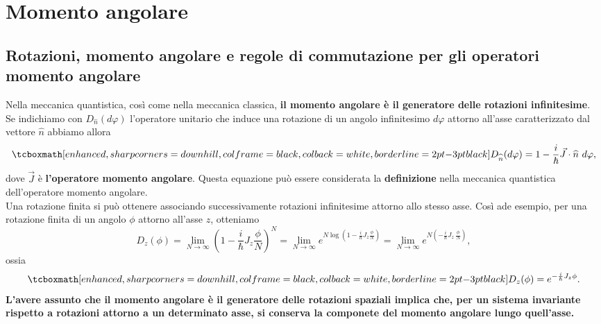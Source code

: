 \chapter{Momento angolare}
\section[Rotazioni, momento angolare e regole di commutazione]{Rotazioni, momento angolare e regole di commutazione per gli operatori momento angolare}
Nella meccanica quantistica, così come nella meccanica classica, \textbf{il momento angolare è il generatore delle rotazioni infinitesime}.\\

Se indichiamo con $D_{\widehat{n}} (d\varphi)$ l'operatore unitario che induce una rotazione di un angolo infinitesimo $d\varphi$ attorno all'asse caratterizzato dal vettore $\widehat{n}$ abbiamo allora
	\begin{equation}
		\tcboxmath[enhanced, sharp corners=downhill, colframe=black, colback=white, borderline={2pt}{-3pt}{black}]{
			D_{\widehat{n}} (d\varphi)=1-\frac{i}{\hbar}\vec{J}\cdot \widehat{n}\ d\varphi ,
			}
	\end{equation}
dove $\vec{J}$ è \textbf{l'operatore momento angolare}. Questa equazione può essere considerata la \textbf{definizione} nella meccanica quantistica dell'operatore momento angolare.\\

Una rotazione finita si può ottenere associando successivamente rotazioni infinitesime attorno allo stesso asse. Così ade esempio, per una rotazione finita di un angolo $\phi$ attorno all'asse $z$, otteniamo
	\begin{equation}
		D_z (\phi) = \lim _{N\rightarrow \infty} \left(1-\frac{i}{\hbar} J_z \frac{\phi}{N}\right) ^N= \lim _{N\rightarrow \infty} e^{N\log\left(1-\frac{i}{\hbar} J_z \frac{\phi}{N}\right)}= \lim _{N\rightarrow \infty} e^{N\left(-\frac{i}{\hbar} J_z \ \frac{\phi}{N}\right)},
	\end{equation}
ossia
	\begin{equation}
		\tcboxmath[enhanced, sharp corners=downhill, colframe=black, colback=white, borderline={2pt}{-3pt}{black}]{
			D_z (\phi)=e^{-\frac{i}{\hbar} J_z \phi}.
			}
	\end{equation}
\textbf{L'avere assunto che il momento angolare è il generatore delle rotazioni spaziali implica che, per un sistema invariante rispetto a rotazioni attorno a un determinato asse, si conserva la componete del momento angolare lungo quell'asse.}\\

